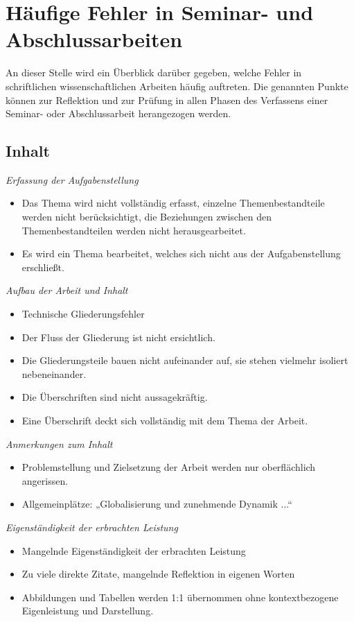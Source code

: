 \chapter{Häufige Fehler in Seminar- und Abschlussarbeiten}
An dieser Stelle wird ein Überblick darüber gegeben, welche Fehler in schriftlichen wissenschaftlichen Arbeiten häufig auftreten. Die genannten Punkte können zur Reflektion und zur Prüfung in allen Phasen des Verfassens einer Seminar- oder Abschlussarbeit herangezogen werden. 

\section{Inhalt}

\emph{Erfassung der Aufgabenstellung}
\begin{itemize}
    \item Das Thema wird nicht vollständig erfasst, einzelne Themenbestandteile werden nicht berücksichtigt, die Beziehungen zwischen den Themenbestandteilen werden nicht herausgearbeitet. 
    \item Es wird ein Thema bearbeitet, welches sich nicht aus der Aufgabenstellung erschließt.
\end{itemize}

\emph{Aufbau der Arbeit und Inhalt}
\begin{itemize}
    \item Technische Gliederungsfehler
    \item Der Fluss der Gliederung ist nicht ersichtlich.
    \item Die Gliederungsteile bauen nicht aufeinander auf, sie stehen vielmehr isoliert nebeneinander.
    \item Die Überschriften sind nicht aussagekräftig.
    \item Eine Überschrift deckt sich vollständig mit dem Thema der Arbeit.
\end{itemize}

\emph{Anmerkungen zum Inhalt}
\begin{itemize}
    \item Problemstellung und Zielsetzung der Arbeit werden nur oberflächlich angerissen.
    \item Allgemeinplätze: „Globalisierung und zunehmende Dynamik ...“
\end{itemize}

\newpage
\emph{Eigenständigkeit der erbrachten Leistung}
\begin{itemize}
    \item Mangelnde Eigenständigkeit der erbrachten Leistung
    \item Zu viele direkte Zitate, mangelnde Reflektion in eigenen Worten
    \item Abbildungen und Tabellen werden 1:1 übernommen ohne kontextbezogene Eigenleistung und Darstellung. 
\end{itemize}

